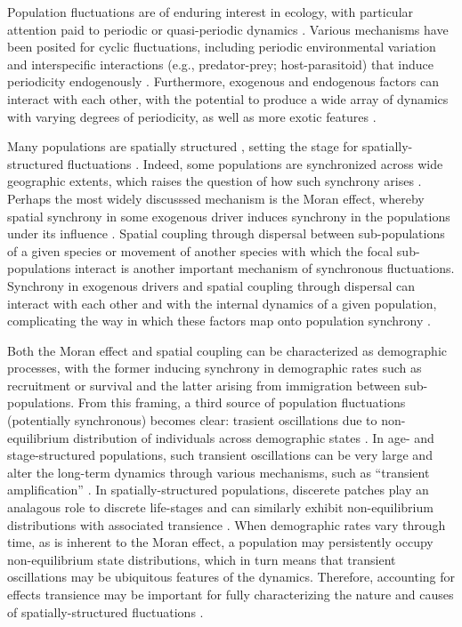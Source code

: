 \documentclass[11pt]{article}
\begin{document}
Population fluctuations are of enduring interest in ecology,
with particular attention paid to periodic or quasi-periodic dynamics
\citep{elton1924, myers2018}.
Various mechanisms have been posited for cyclic fluctuations,
including periodic environmental variation and 
interspecific interactions (e.g., predator-prey; host-parasitoid)
that induce periodicity endogenously 
\citep{nicholson1935, andrewartha1954, rosenzweig1963}. 
Furthermore, exogenous and endogenous factors can interact with each other,
with the potential to produce a wide array of dynamics with
varying degrees of periodicity, as well as more exotic features
\citep{bjornstad2001, turchin2003, ives2008}.

Many populations are spatially structured \citep{hanski1998},
setting the stage for spatially-structured fluctuations 
\citep{bjornstad1999spatial, gouveia2016}.
Indeed, some populations are synchronized across wide geographic extents,
which raises the question of how such synchrony arises
\citep{ranta1995synchrony, krebs2002}.
Perhaps the most widely discusssed mechanism is the Moran effect,
whereby spatial synchrony in some exogenous driver induces synchrony
in the populations under its influence
\citep{moran1953}. 
Spatial coupling through dispersal between sub-populations of a given species
\citep{liebhold2004, goldwyn2008}
or movement of another species with which the focal sub-populations interact
\citep{gilg2009, ims2000}
is another important mechanism of synchronous fluctuations.
Synchrony in exogenous drivers and spatial coupling through dispersal 
can interact with each other and with the internal dynamics of a given population,
complicating the way in which these factors map onto population synchrony
\citep{ranta1995synchrony, kendall2000dispersal, abbott2011}.

Both the Moran effect and spatial coupling can be characterized as demographic processes,
with the former inducing synchrony in demographic rates such as recruitment or survival
and the latter arising from immigration between sub-populations.
From this framing,
a third source of population fluctuations (potentially synchronous) becomes clear:
trasient oscillations due to non-equilibrium distribution of individuals across
demographic states
\citep{caswell2001matrix, koons2017understanding}.
In age- and stage-structured populations, 
such transient oscillations can be very large and alter the long-term dynamics 
through various mechanisms,
such as ``transient amplification''
\citep{neubert1997, tenhumberg2009}. 
In spatially-structured populations, 
discerete patches play an analagous role to discrete life-stages 
and can similarly exhibit non-equilibrium distributions with associated transience
\citep{ozgul2009}.
When demographic rates vary through time,
as is inherent to the Moran effect,
a population may persistently occupy non-equilibrium state distributions,
which in turn means that transient oscillations may be ubiquitous features of the dynamics.
Therefore, accounting for effects transience may be important for 
fully characterizing the nature and causes of spatially-structured fluctuations
\citep{hastings2010}.
\end{document}

